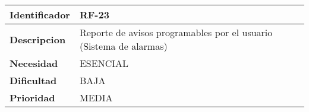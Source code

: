 \begin{center}
    \begin{tabular}{|p{2.6cm}|p{12cm}|}
    \hline
    \textbf{Identificador} & RF-23\\
    \hline
    \textbf{Descripcion} & Reporte de avisos programables por el usuario (Sistema de alarmas)\\
    \hline
    \textbf{Necesidad} & ESENCIAL\\
    \hline
    \textbf{Dificultad} & BAJA\\
    \hline
    \textbf{Prioridad} & MEDIA\\
    \hline
    \end{tabular}
\end{center}
